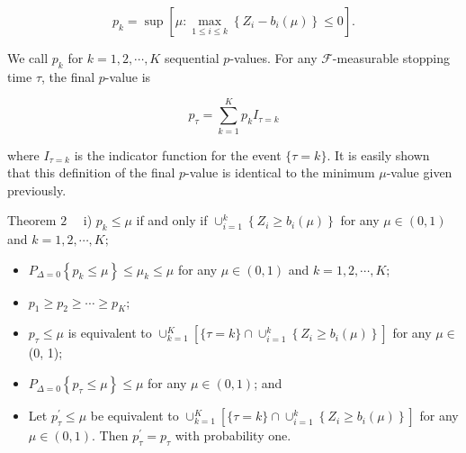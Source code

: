 \documentclass[10pt]{article}
\begin{document}
\begin{equation*}
p_{k}=\sup \left[\mu: \max _{1 \leq i \leq k}\left\{Z_{i}-b_{i}(\mu)\right\} \leq 0\right] . \tag{5}
\end{equation*}


We call $p_{k}$ for $k=1,2, \cdots, K$ sequential $p$-values. For any $\mathcal{F}$-measurable stopping time $\tau$, the final $p$-value is


\begin{equation*}
p_{\tau}=\sum_{k=1}^{K} p_{k} I_{\tau=k} \tag{6}
\end{equation*}


where $I_{\tau=k}$ is the indicator function for the event $\{\tau=k\}$. It is easily shown\\
that this definition of the final $p$-value is identical to the minimum $\mu$-value given previously.

Theorem $2 \quad$ i) $p_{k} \leq \mu$ if and only if $\cup_{i=1}^{k}\left\{Z_{i} \geq b_{i}(\mu)\right\}$ for any $\mu \in(0,1)$ and $k=1,2, \cdots, K ;$

\begin{itemize}
  \item[ii)] $P_{\Delta=0}\left\{p_{k} \leq \mu\right\} \leq \mu_{k} \leq \mu$ for any $\mu \in(0,1)$ and $k=1,2, \cdots, K$;
  \item[iii)] $p_{1} \geq p_{2} \geq \cdots \geq p_{K}$;
  \item[iv)] $p_{\tau} \leq \mu$ is equivalent to $\cup_{k=1}^{K}\left[\{\tau=k\} \cap \cup_{i=1}^{k}\left\{Z_{i} \geq b_{i}(\mu)\right\}\right]$ for any $\mu \in$ (0, 1);
  \item[v)] $P_{\Delta=0}\left\{p_{\tau} \leq \mu\right\} \leq \mu$ for any $\mu \in(0,1)$; and
  \item[vi)] Let $p_{\tau}^{\prime} \leq \mu$ be equivalent to $\cup_{k=1}^{K}\left[\{\tau=k\} \cap \cup_{i=1}^{k}\left\{Z_{i} \geq b_{i}(\mu)\right\}\right]$ for any $\mu \in(0,1)$. Then $p_{\tau}^{\prime}=p_{\tau}$ with probability one.
\end{itemize}
\end{document}

